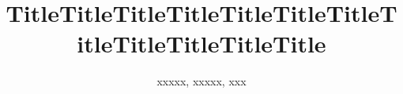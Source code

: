 \documentclass[final]{beamer}
\title{TitleTitleTitleTitleTitleTitleTitleTitleTitleTitleTitleTitle}
\author{xxxxx, xxxxx, xxx}
\institute{ Department of xxxxxxxxx,xxxxxxxxxxxxxxxx}
\begin{document}
\begin{frame}[t]
\end{frame}
\end{document}
